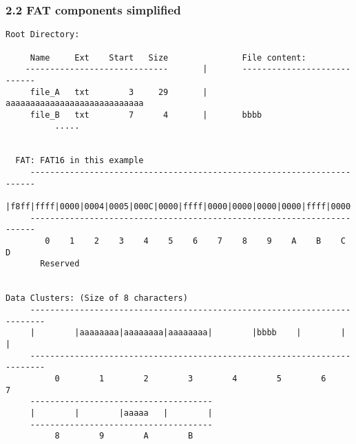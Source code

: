 \begin{frame}[fragile]
  \frametitle{2.2 FAT components simplified}
  \begin{lstlisting}[basicstyle=\tiny]
Root Directory: 
                                                                           
     Name     Ext    Start   Size               File content:
    -----------------------------       |       ----------------------------
     file_A   txt        3     29       |       aaaaaaaaaaaaaaaaaaaaaaaaaaaa
     file_B   txt        7      4       |       bbbb
          .....                                                             
                                                                             
                                                                             
  FAT: FAT16 in this example                                                 
     -----------------------------------------------------------------------
     |f8ff|ffff|0000|0004|0005|000C|0000|ffff|0000|0000|0000|0000|ffff|0000|
     -----------------------------------------------------------------------
        0    1    2    3    4    5    6    7    8    9    A    B    C    D 
       Reserved 
                                                                             
                                                                             
Data Clusters: (Size of 8 characters)
     -------------------------------------------------------------------------
     |        |aaaaaaaa|aaaaaaaa|aaaaaaaa|        |bbbb    |        |        |
     -------------------------------------------------------------------------
          0        1        2        3        4        5        6        7  
     -------------------------------------
     |        |        |aaaaa   |        |
     -------------------------------------
          8        9        A        B       
  \end{lstlisting}
\end{frame}


